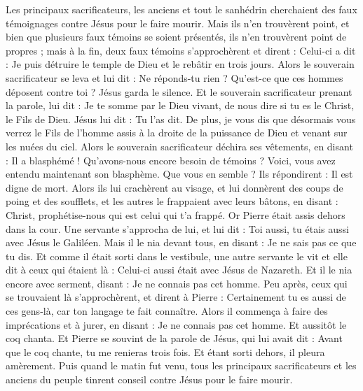 \begin{multicols}{2}
Les principaux sacrificateurs, les anciens et tout le sanhédrin cherchaient des faux témoignages contre Jésus pour le faire mourir.
Mais ils n'en trouvèrent point, et bien que plusieurs faux témoins se soient présentés, ils n'en trouvèrent point de propres ; mais à la fin, deux faux témoins s'approchèrent
et dirent : Celui-ci a dit : Je puis détruire le temple de Dieu et le rebâtir en trois jours.
Alors le souverain sacrificateur se leva et lui dit : Ne réponds-tu rien ? Qu'est-ce que ces hommes déposent contre toi ?
Jésus garda le silence. Et le souverain sacrificateur prenant la parole, lui dit : Je te somme par le Dieu vivant, de nous dire si tu es le Christ, le Fils de Dieu.
Jésus lui dit : Tu l'as dit. De plus, je vous dis que désormais vous verrez le Fils de l'homme assis à la droite de la puissance de Dieu et venant sur les nuées du ciel.
Alors le souverain sacrificateur déchira ses vêtements, en disant : Il a blasphémé ! Qu'avons-nous encore besoin de témoins ? Voici, vous avez entendu maintenant son blasphème. Que vous en semble ?
Ils répondirent : Il est digne de mort.
Alors ils lui crachèrent au visage, et lui donnèrent des coups de poing et des soufflets, et les autres le frappaient avec leurs bâtons,
en disant : Christ, prophétise-nous qui est celui qui t'a frappé.
Or Pierre était assis dehors dans la cour. Une servante s'approcha de lui, et lui dit : Toi aussi, tu étais aussi avec Jésus le Galiléen.
Mais il le nia devant tous, en disant : Je ne sais pas ce que tu dis.
Et comme il était sorti dans le vestibule, une autre servante le vit et elle dit à ceux qui étaient là : Celui-ci aussi était avec Jésus de Nazareth.
Et il le nia encore avec serment, disant : Je ne connais pas cet homme.
Peu après, ceux qui se trouvaient là s'approchèrent, et dirent à Pierre : Certainement tu es aussi de ces gens-là, car ton langage te fait connaître.
Alors il commença à faire des imprécations et à jurer, en disant : Je ne connais pas cet homme. Et aussitôt le coq chanta.
Et Pierre se souvint de la parole de Jésus, qui lui avait dit : Avant que le coq chante, tu me renieras trois fois. Et étant sorti dehors, il pleura amèrement.
\VerseOne{}Puis quand le matin fut venu, tous les principaux sacrificateurs et les anciens du peuple tinrent conseil contre Jésus pour le faire mourir.

\end{multicols}
